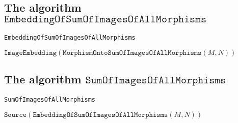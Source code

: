 \subsection{The algorithm $\mathtt{EmbeddingOfSumOfImagesOfAllMorphisms}$}

\begin{algorithm}[H]\capstart
    \caption{\texttt{EmbeddingOfSumOfImagesOfAllMorphisms}}\label{algo:EmbeddingOfSumOfImagesOfAllMorphisms}
	\BlankLine
	\Return $\mathtt{ImageEmbedding}( \mathtt{MorphismOntoSumOfImagesOfAllMorphisms}( M, N ) )$\;
\end{algorithm}

\subsection{The algorithm $\mathtt{SumOfImagesOfAllMorphisms}$}

\begin{algorithm}[H]\capstart
    \caption{\texttt{SumOfImagesOfAllMorphisms}}\label{algo:SumOfImagesOfAllMorphisms}
	\BlankLine
	\Return $\mathtt{Source}( \mathtt{EmbeddingOfSumOfImagesOfAllMorphisms}( M, N ) )$\;
\end{algorithm}








